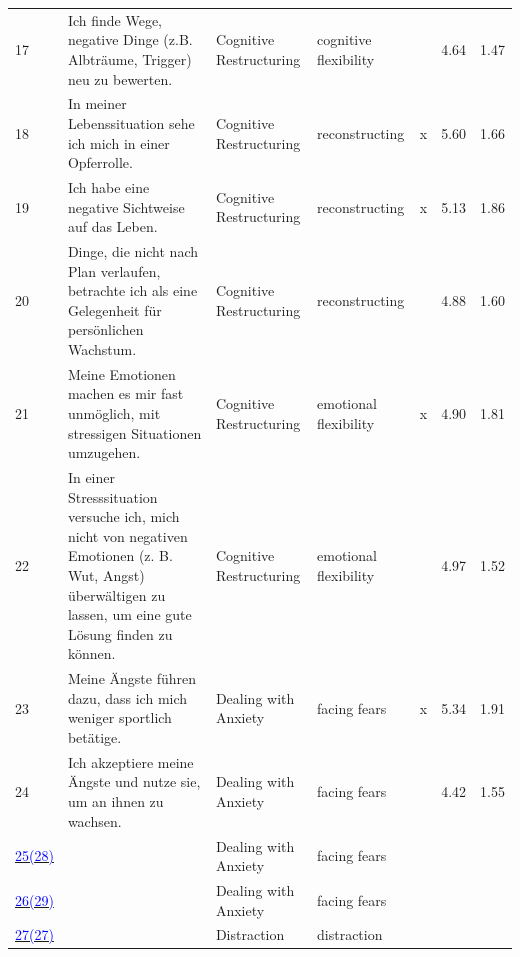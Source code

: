 \documentclass[
  man,floatsintext]{apa7}
\begin{document}
\begin{center}
\begin{ThreePartTable}
{\begin{longtable}{m{0.6cm}m{7.3cm}m{2.2cm}m{2.2cm}m{0.2cm}m{0.4cm}m{0.4cm}}
17 & Ich finde Wege, negative Dinge (z.B. Albträume, Trigger) neu zu bewerten. & Cognitive Restructuring & cognitive flexibility &  & 4.64 & 1.47\\
18 & In meiner Lebenssituation sehe ich mich in einer Opferrolle. & Cognitive Restructuring & reconstructing & x & 5.60 & 1.66\\
19 & Ich habe eine negative Sichtweise auf das Leben. & Cognitive Restructuring & reconstructing & x & 5.13 & 1.86\\
20 & Dinge, die nicht nach Plan verlaufen, betrachte ich als eine Gelegenheit für persönlichen Wachstum. & Cognitive Restructuring & reconstructing &  & 4.88 & 1.60\\
21 & Meine Emotionen machen es mir fast unmöglich, mit stressigen Situationen umzugehen. & Cognitive Restructuring & emotional flexibility & x & 4.90 & 1.81\\
22 & In einer Stresssituation versuche ich, mich nicht von negativen Emotionen (z. B. Wut, Angst) überwältigen zu lassen, um eine gute Lösung finden zu können. & Cognitive Restructuring & emotional flexibility &  & 4.97 & 1.52\\
23 & Meine Ängste führen dazu, dass ich mich weniger sportlich betätige. & Dealing with Anxiety & facing fears & x & 5.34 & 1.91\\
24 & Ich akzeptiere meine Ängste und nutze sie, um an ihnen zu wachsen. & Dealing with Anxiety & facing fears &  & 4.42 & 1.55\\
\label{umgan_1_221}\hyperref[table1]{\textcolor{blue}{25(28)}} & \cellcolor{lightgray}{Um meine Ängste zu überwinden, mache ich mir dafür notwendige Verhaltensweisen und Fähigkeiten bewusst und setze diese um.} & Dealing with Anxiety & facing fears & \cellcolor{lightgray}{\ } & \cellcolor{lightgray}{4.70} & \cellcolor{lightgray}{1.48}\\
\label{umgan_1_222}\hyperref[table1]{\textcolor{blue}{26(29)}} & \cellcolor{lightgray}{Ängste, die entlang meines Weges aufkommen, entmutigen mich nicht, sondern motivieren mich dabei meine Ziele zu erreichen.} & Dealing with Anxiety & facing fears & \cellcolor{lightgray}{\ } & \cellcolor{lightgray}{4.14} & \cellcolor{lightgray}{1.44}\\
\label{ablen_1_048}\hyperref[table1]{\textcolor{blue}{27(27)}} & \cellcolor{lightgray}{Ich versuche, körperliche Schmerzen (z.B. im Rücken, in Gelenken) mit sportlicher Betätigung zu reduzieren.} & Distraction & distraction & \cellcolor{lightgray}{\ } & \cellcolor{lightgray}{4.53} & \cellcolor{lightgray}{1.94}\\

\end{longtable}}
\end{ThreePartTable}
\end{center}
\end{document}
